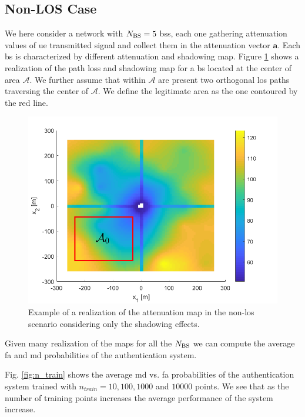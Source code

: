 \documentclass[twocolumns]{IEEEtran}
\begin{document}
\subsection{Non-LOS Case}
We here consider a network with $N_{\rm BS}=5$ \acp{bs}, each one gathering attenuation values of \ac{ue} transmitted signal and collect them in the attenuation vector $\bm{a}$. Each \ac{bs} is characterized by different attenuation and shadowing map. Figure \ref{fig:trueMap} shows a realization of the path loss and shadowing map for a \ac{bs} located at the center of area $\mathcal{A}$. We further assume that within $\mathcal{A}$ are present two orthogonal \ac{los} paths traversing the center of $\mathcal{A}$. We define the legitimate area as the one contoured by the red line.


\begin{figure}[h]
    \centering
    \includegraphics[width=1\columnwidth]{surfColorato.png}
    \caption{Example of a realization of the attenuation map in the non-\ac{los} scenario considering only the shadowing effects.}
    \label{fig:trueMap}
\end{figure}

Given many realization of the maps for all the $N_{\rm BS}$ we can compute the average \ac{fa} and \ac{md} probabilities of the authentication system.

Fig. \ref{fig:n_train} shows the average \ac{md} vs. \ac{fa} probabilities of the authentication system trained with $n_{train} = 10, 100, 1000$ and $10000$ points. We see that as the number of training points increases the average performance of the system increase. 
\end{document}
